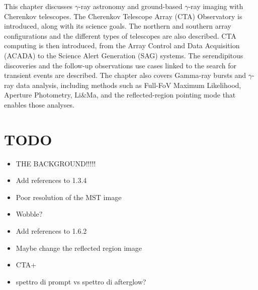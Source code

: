\begin{chapabstract}
\small{
This chapter discusses $\gamma$-ray astronomy and ground-based $\gamma$-ray imaging with Cherenkov telescopes. The Cherenkov Telescope Array (CTA) Observatory is introduced, along with its science goals. The northern and southern array configurations and the different types of telescopes are also described. CTA computing is then introduced, from the Array Control and Data Acquisition (ACADA) to the Science Alert Generation (SAG) systems. The serendipitous discoveries and the follow-up observations use cases linked to the search for transient events are described. The chapter also covers Gamma-ray bursts and $\gamma$-ray data analysis, including methods such as Full-FoV Maximum Likelihood, Aperture Photometry, Li\&Ma, and the reflected-region pointing mode that enables those analyses.
}\\
\begin{center}
\noindent\makebox[0.8\linewidth]{\rule{0.66\paperwidth}{0.4pt}}
\end{center}
\vspace{1cm}
\end{chapabstract}


\section{TODO}
\begin{itemize}
    \item THE BACKGROUND!!!!! 
    \item Add references to 1.3.4
    \item Poor resolution of the MST image
    \item Wobble?
    \item Add references to 1.6.2 
    \item Maybe change the reflected region image
    \item CTA+
    \item spettro di prompt vs spettro di afterglow?
\end{itemize}

